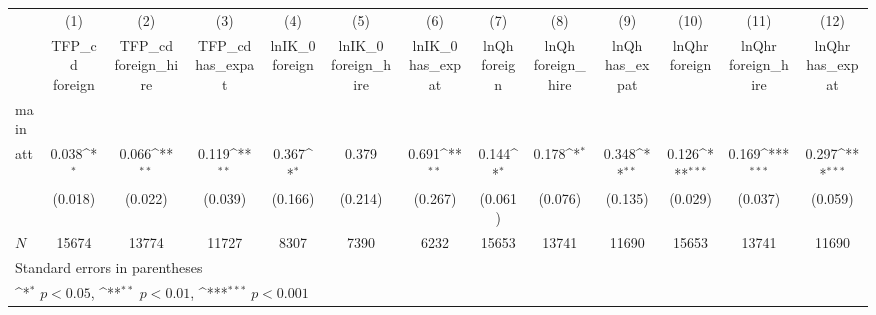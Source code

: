 {
\def\sym#1{\ifmmode^{#1}\else\(^{#1}\)\fi}
\begin{tabular}{l*{12}{c}}
\hline\hline
            &\multicolumn{1}{c}{(1)}&\multicolumn{1}{c}{(2)}&\multicolumn{1}{c}{(3)}&\multicolumn{1}{c}{(4)}&\multicolumn{1}{c}{(5)}&\multicolumn{1}{c}{(6)}&\multicolumn{1}{c}{(7)}&\multicolumn{1}{c}{(8)}&\multicolumn{1}{c}{(9)}&\multicolumn{1}{c}{(10)}&\multicolumn{1}{c}{(11)}&\multicolumn{1}{c}{(12)}\\
            &\multicolumn{1}{c}{TFP\_cd  foreign}&\multicolumn{1}{c}{TFP\_cd  foreign\_hire}&\multicolumn{1}{c}{TFP\_cd  has\_expat}&\multicolumn{1}{c}{lnIK\_0  foreign}&\multicolumn{1}{c}{lnIK\_0  foreign\_hire}&\multicolumn{1}{c}{lnIK\_0  has\_expat}&\multicolumn{1}{c}{lnQh  foreign}&\multicolumn{1}{c}{lnQh  foreign\_hire}&\multicolumn{1}{c}{lnQh  has\_expat}&\multicolumn{1}{c}{lnQhr  foreign}&\multicolumn{1}{c}{lnQhr  foreign\_hire}&\multicolumn{1}{c}{lnQhr  has\_expat}\\
\hline
main        &                     &                     &                     &                     &                     &                     &                     &                     &                     &                     &                     &                     \\
att         &       0.038\sym{*}  &       0.066\sym{**} &       0.119\sym{**} &       0.367\sym{*}  &       0.379         &       0.691\sym{**} &       0.144\sym{*}  &       0.178\sym{*}  &       0.348\sym{**} &       0.126\sym{***}&       0.169\sym{***}&       0.297\sym{***}\\
            &     (0.018)         &     (0.022)         &     (0.039)         &     (0.166)         &     (0.214)         &     (0.267)         &     (0.061)         &     (0.076)         &     (0.135)         &     (0.029)         &     (0.037)         &     (0.059)         \\
\hline
\(N\)       &       15674         &       13774         &       11727         &        8307         &        7390         &        6232         &       15653         &       13741         &       11690         &       15653         &       13741         &       11690         \\
\hline\hline
\multicolumn{13}{l}{\footnotesize Standard errors in parentheses}\\
\multicolumn{13}{l}{\footnotesize \sym{*} \(p<0.05\), \sym{**} \(p<0.01\), \sym{***} \(p<0.001\)}\\
\end{tabular}
}
